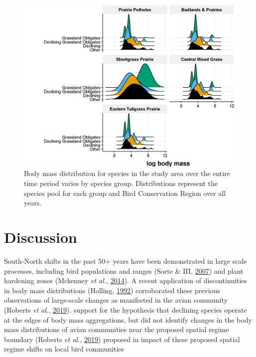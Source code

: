\documentclass[print]{nuthesis}
\begin{document}
\begin{figure}
\includegraphics[width=0.85\linewidth]{.//chapterFiles/discontinuityAnalysis/figsCalledInDiss/bmDistPerSppGroup-byBCR} \caption{Body mass distribution for species in the study area over the entire time period varies by species group. Distributions represent the species pool for each group and Bird Conservation Region over all years.}\label{fig:bmDistPerSppGroup-byBCR}
\end{figure}
\hypertarget{discussion-4}{%
\section{Discussion}\label{discussion-4}}

South-North shifts in the past 50+ years have been demonstrated in large scale processes, including bird populations and ranges (Sorte \& III, \protect\hyperlink{ref-sorte2007poleward}{2007}) and plant hardening zones (Mckenney \emph{et al.}, \protect\hyperlink{ref-mckenney2014change}{2014}). A recent application of discontinuities in body mass distributions (Holling, \protect\hyperlink{ref-holling1992cross}{1992}) corroborated these previous observations of large-scale changes as manifested in the avian community (Roberts \emph{et al.}, \protect\hyperlink{ref-roberts2019shifting}{2019}). support for the hypothesis that declining species operate at the edges of body mass aggregations, but did not identify changes in the body mass distributions of avian communities near the proposed spatial regime boundary (Roberts \emph{et al.}, \protect\hyperlink{ref-roberts2019shifting}{2019}) proposed in impact of these proposed spatial regime shifts on local bird communities
\end{document}
